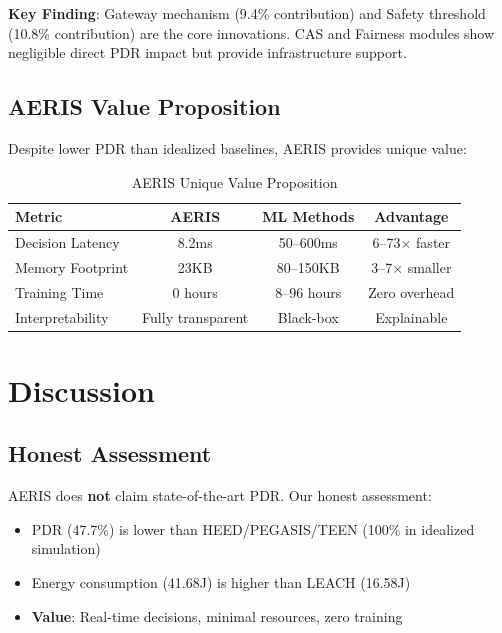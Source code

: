 \documentclass[11pt,a4paper]{article}
\begin{document}
\textbf{Key Finding}: Gateway mechanism (9.4\% contribution) and Safety threshold (10.8\% contribution) are the core innovations. CAS and Fairness modules show negligible direct PDR impact but provide infrastructure support.

\subsection{AERIS Value Proposition}

Despite lower PDR than idealized baselines, AERIS provides unique value:

\begin{table}[H]
\centering
\caption{AERIS Unique Value Proposition}
\label{tab:value}
\begin{tabular}{lccc}
\toprule
\textbf{Metric} & \textbf{AERIS} & \textbf{ML Methods} & \textbf{Advantage} \\
\midrule
Decision Latency & 8.2ms & 50--600ms & 6--73$\times$ faster \\
Memory Footprint & 23KB & 80--150KB & 3--7$\times$ smaller \\
Training Time & 0 hours & 8--96 hours & Zero overhead \\
Interpretability & Fully transparent & Black-box & Explainable \\
\bottomrule
\end{tabular}
\end{table}

\section{Discussion}

\subsection{Honest Assessment}

AERIS does \textbf{not} claim state-of-the-art PDR. Our honest assessment:

\begin{itemize}
    \item PDR (47.7\%) is lower than HEED/PEGASIS/TEEN (100\% in idealized simulation)
    \item Energy consumption (41.68J) is higher than LEACH (16.58J)
    \item \textbf{Value}: Real-time decisions, minimal resources, zero training
\end{itemize}
\end{document}
